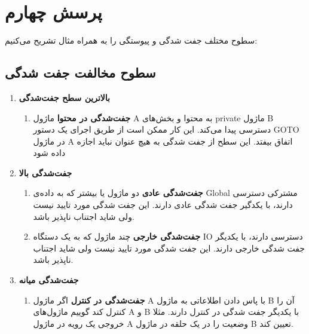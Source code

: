 
\section{پرسش چهارم}

سطوح مختلف جفت شدگی 
و پیوستگی
را به همراه مثال تشریح می‌کنیم:

\subsection{سطوح مخالفت جفت شدگی}
\begin{enumerate}
\item \textbf{بالاترین سطح جفت‌شدگی} \newline
\begin{enumerate}
\item \textbf{جفت‌شدگی در محتوا} \newline
ماژول A به محتوا و بخش‌های private ماژول B دسترسی پیدا می‌کند. این کار ممکن است از طریق اجرای یک دستور  GOTO در ماژول A اتفاق بیفتد. این سطح از جفت شدگی به هیچ عنوان نباید اجازه داده شود
\end{enumerate}
\item \textbf{جفت‌شدگی بالا} \newline
\begin{enumerate}
\item \textbf{جفت‌شدگی عادی} \newline
دو ماژول یا بیشتر که به داده‌ی Global مشترکی دسترسی دارند، با یکدگیر جفت شدگی عادی دارند. این جفت شدگی مورد تایید نیست ولی شاید اجتناب ناپذیر باشد.
\item \textbf{جفت‌شدگی خارجی} \newline
چند ماژول که به یک دستگاه IO دسترسی دارند، با  یکدیگر جفت شدگی خارجی دارند. این جفت شدگی مورد تایید نیست ولی شاید اجتناب ناپذیر باشد.
\end{enumerate}
\item \textbf{جفت‌شدگی میانه} \newline
\begin{enumerate}
\item \textbf{جفت‌شدگی در کنترل} \newline
اگر ماژول A با پاس دادن اطلاعاتی به ماژول B آن را کنترل کند گوییم ماژول‌های A و B با یکدیگر جفت شدگی در کنترل دارند. مثلا خروجی یک رویه در ماژول A وضعیت را در یک حلقه در ماژول B تعیین کند.


\end{enumerate}
\end{enumerate}
